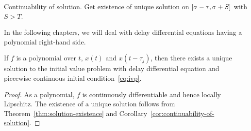     \begin{corollary}\label{cor:continuability-of-solution}
        Continuability of solution.
        Get existence of unique solution on $[\sigma-\tau,\sigma+S]$ with $S>T$.
    \end{corollary}


    In the following chapters, we will deal with delay differential equations having a polynomial right-hand side.
    \begin{corollary}
        If $f$ is a polynomial over $t$, $x(t)$ and $x(t-\tau_j)$, then there exists a unique solution to the initial value problem with delay differential equation and piecewise continuous initial condition~\eqref{eq:ivp}.
    \end{corollary}
    \begin{proof}
        As a polynomial, $f$ is continuously differentiable and hence locally Lipschitz. The existence of a unique solution follows from Theorem~\ref{thm:solution-existence} and Corollary~\ref{cor:continuability-of-solution}.
    \end{proof}

